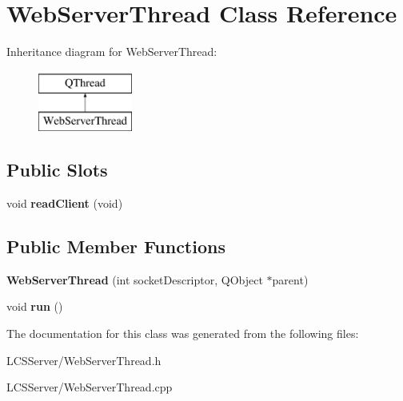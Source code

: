 \hypertarget{class_web_server_thread}{}\section{Web\+Server\+Thread Class Reference}
\label{class_web_server_thread}
Inheritance diagram for Web\+Server\+Thread\+:\begin{figure}[H]
\begin{center}
\leavevmode
\includegraphics[height=2.000000cm]{class_web_server_thread}
\end{center}
\end{figure}
\subsection*{Public Slots}
\begin{DoxyCompactItemize}
\item 
\mbox{\label{class_web_server_thread_a1dba5a6a19672c18bb1cec2a08b779ae}} 
void {\bfseries read\+Client} (void)
\end{DoxyCompactItemize}
\subsection*{Public Member Functions}
\begin{DoxyCompactItemize}
\item 
\mbox{\label{class_web_server_thread_a8e66279390f71cac5263689b4fc60c23}} 
{\bfseries Web\+Server\+Thread} (int socket\+Descriptor, Q\+Object $\ast$parent)
\item 
\mbox{\label{class_web_server_thread_a301c2ed6e2d0c9a020089862e20b7da6}} 
void {\bfseries run} ()
\end{DoxyCompactItemize}


The documentation for this class was generated from the following files\+:\begin{DoxyCompactItemize}
\item 
L\+C\+S\+Server/Web\+Server\+Thread.\+h\item 
L\+C\+S\+Server/Web\+Server\+Thread.\+cpp\end{DoxyCompactItemize}
